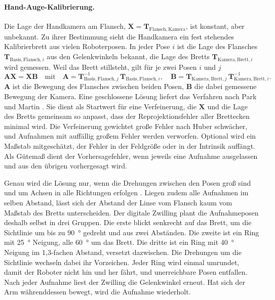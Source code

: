 \paragraph{Hand-Auge-Kalibrierung.}
Die Lage der Handkamera am Flansch, $\mathbf{X} = \mathbf{T}_{\mathrm{Flansch,Kamera}}$, ist konstant, aber unbekannt. Zu ihrer Bestimmung sieht die Handkamera ein fest stehendes Kalibrierbrett aus vielen Roboterposen. In jeder Pose $i$ ist die Lage des Flansches $\mathbf{T}_{\mathrm{Basis,Flansch},i}$ aus den Gelenkwinkeln bekannt, die Lage des Bretts $\mathbf{T}_{\mathrm{Kamera,Brett},i}$ wird gemessen. Weil das Brett stillsteht, gilt für je zwei Posen $i$ und $j$
\begin{equation}
    \mathbf{A}\mathbf{X} = \mathbf{X}\mathbf{B}
    \quad\text{mit}\quad
    \mathbf{A} = \mathbf{T}_{\mathrm{Basis,Flansch},j}^{-1}\, \mathbf{T}_{\mathrm{Basis,Flansch},i},
    \quad
    \mathbf{B} = \mathbf{T}_{\mathrm{Kamera,Brett},j}\, \mathbf{T}_{\mathrm{Kamera,Brett},i}^{-1} .
    \label{eq:bv-axxb}
\end{equation}
$\mathbf{A}$ ist die Bewegung des Flansches zwischen beiden Posen, $\mathbf{B}$ die dabei gemessene Bewegung der Kamera. Eine geschlossene Lösung liefert das Verfahren nach Park und Martin \cite{ParkMartin1994}. Sie dient als Startwert für eine Verfeinerung, die $\mathbf{X}$ und die Lage des Bretts gemeinsam so anpasst, dass der Reprojektionsfehler aller Brettecken minimal wird. Die Verfeinerung gewichtet große Fehler nach Huber schwächer, und Aufnahmen mit auffällig großem Fehler werden verworfen. Optional wird ein Maßstab mitgeschätzt, der Fehler in der Feldgröße oder in der Intrinsik auffängt. Als Gütemaß dient der Vorhersagefehler, wenn jeweils eine Aufnahme ausgelassen und aus den übrigen vorhergesagt wird.

Genau wird die Lösung nur, wenn die Drehungen zwischen den Posen groß sind und um Achsen in alle Richtungen erfolgen \cite{Tsai1989}. Liegen zudem alle Aufnahmen im selben Abstand, lässt sich der Abstand der Linse vom Flansch kaum vom Maßstab des Bretts unterscheiden. Der digitale Zwilling plant die Aufnahmeposen deshalb selbst in drei Gruppen. Die erste blickt senkrecht auf das Brett, um die Sichtlinie um bis zu \SI{90}{\degree} gedreht und aus zwei Abständen. Die zweite ist ein Ring mit \SI{25}{\degree} Neigung, alle \SI{60}{\degree} um das Brett. Die dritte ist ein Ring mit \SI{40}{\degree} Neigung im 1,3-fachen Abstand, versetzt dazwischen. Die Drehungen um die Sichtlinie wechseln dabei ihr Vorzeichen. Jeder Ring wird einmal umrundet, damit der Roboter nicht hin und her fährt, und unerreichbare Posen entfallen. Nach jeder Aufnahme liest der Zwilling die Gelenkwinkel erneut. Hat sich der Arm währenddessen bewegt, wird die Aufnahme wiederholt.

